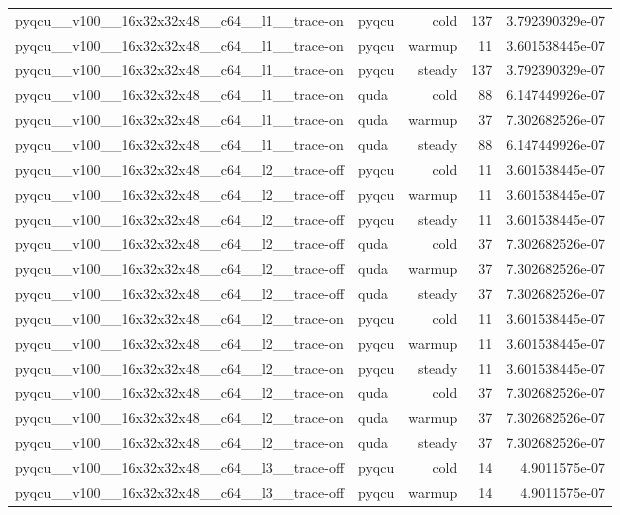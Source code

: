 \begin{table}[htbp]
\begin{tabular}{@{}llrrr@{}}
pyqcu\_\_v100\_\_16x32x32x48\_\_c64\_\_l1\_\_trace-on & pyqcu & cold & 137 & 3.792390329e-07 \\
pyqcu\_\_v100\_\_16x32x32x48\_\_c64\_\_l1\_\_trace-on & pyqcu & warmup & 11 & 3.601538445e-07 \\
pyqcu\_\_v100\_\_16x32x32x48\_\_c64\_\_l1\_\_trace-on & pyqcu & steady & 137 & 3.792390329e-07 \\
pyqcu\_\_v100\_\_16x32x32x48\_\_c64\_\_l1\_\_trace-on & quda & cold & 88 & 6.147449926e-07 \\
pyqcu\_\_v100\_\_16x32x32x48\_\_c64\_\_l1\_\_trace-on & quda & warmup & 37 & 7.302682526e-07 \\
pyqcu\_\_v100\_\_16x32x32x48\_\_c64\_\_l1\_\_trace-on & quda & steady & 88 & 6.147449926e-07 \\
pyqcu\_\_v100\_\_16x32x32x48\_\_c64\_\_l2\_\_trace-off & pyqcu & cold & 11 & 3.601538445e-07 \\
pyqcu\_\_v100\_\_16x32x32x48\_\_c64\_\_l2\_\_trace-off & pyqcu & warmup & 11 & 3.601538445e-07 \\
pyqcu\_\_v100\_\_16x32x32x48\_\_c64\_\_l2\_\_trace-off & pyqcu & steady & 11 & 3.601538445e-07 \\
pyqcu\_\_v100\_\_16x32x32x48\_\_c64\_\_l2\_\_trace-off & quda & cold & 37 & 7.302682526e-07 \\
pyqcu\_\_v100\_\_16x32x32x48\_\_c64\_\_l2\_\_trace-off & quda & warmup & 37 & 7.302682526e-07 \\
pyqcu\_\_v100\_\_16x32x32x48\_\_c64\_\_l2\_\_trace-off & quda & steady & 37 & 7.302682526e-07 \\
pyqcu\_\_v100\_\_16x32x32x48\_\_c64\_\_l2\_\_trace-on & pyqcu & cold & 11 & 3.601538445e-07 \\
pyqcu\_\_v100\_\_16x32x32x48\_\_c64\_\_l2\_\_trace-on & pyqcu & warmup & 11 & 3.601538445e-07 \\
pyqcu\_\_v100\_\_16x32x32x48\_\_c64\_\_l2\_\_trace-on & pyqcu & steady & 11 & 3.601538445e-07 \\
pyqcu\_\_v100\_\_16x32x32x48\_\_c64\_\_l2\_\_trace-on & quda & cold & 37 & 7.302682526e-07 \\
pyqcu\_\_v100\_\_16x32x32x48\_\_c64\_\_l2\_\_trace-on & quda & warmup & 37 & 7.302682526e-07 \\
pyqcu\_\_v100\_\_16x32x32x48\_\_c64\_\_l2\_\_trace-on & quda & steady & 37 & 7.302682526e-07 \\
pyqcu\_\_v100\_\_16x32x32x48\_\_c64\_\_l3\_\_trace-off & pyqcu & cold & 14 & 4.9011575e-07 \\
pyqcu\_\_v100\_\_16x32x32x48\_\_c64\_\_l3\_\_trace-off & pyqcu & warmup & 14 & 4.9011575e-07 \\

\end{tabular}
\end{table}
